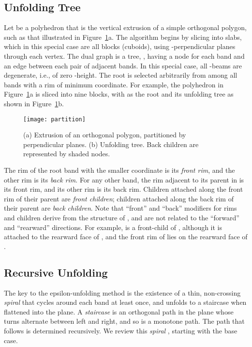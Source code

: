 \documentclass[11pt]{article}
\begin{document}
\subsection{Unfolding Tree}
\label{sec:Tree}
Let  be a polyhedron that is the vertical extrusion of a simple orthogonal polygon, such
as that illustrated in Figure~\ref{fig:partition}a.
The algorithm
begins by slicing  into slabs, which in this special case are all
blocks (cuboids),
using -perpendicular planes through each vertex.
The dual graph is a tree, , having a node for each band and an edge
between each pair of adjacent bands.
In this special case, all -beams are degenerate, i.e., of zero -height.
The root is selected arbitrarily from among
all bands with a rim of
minimum  coordinate. For example, the
polyhedron in Figure~\ref{fig:partition}a is sliced into nine
blocks, with  as the root and
its unfolding tree as shown in Figure~\ref{fig:partition}b.
\begin{figure}[htbp]
\centering
\texttt{[image: partition]}
\caption{(a) Extrusion of an orthogonal polygon, partitioned by  perpendicular planes. (b) Unfolding
  tree. Back children are represented by shaded nodes.}
\label{fig:partition}
\end{figure}


The rim of the root band with the
smaller  coordinate is its \emph{front rim}, and the other rim
is its \emph{back rim}. For any other band, the rim adjacent to its parent in  is
its front rim, and its other rim is its back rim.
Children attached along the front rim of their parent are \emph{front children}; children attached
along the back rim of their parent are \emph{back children}.
Note that ``front'' and ``back'' modifiers for rims and children derive from the structure of
, and are not related to the ``forward'' and ``rearward'' 
directions.
For example,  is a front-child of , although it is attached
to
the rearward face of , and the front rim of  lies
on the rearward face of .



\subsection{Recursive Unfolding}

The key to the epsilon-unfolding method is the existence of a thin, non-crossing \emph{spiral}  that cycles around each band
at least once, and unfolds to a staircase when flattened into the
plane.
A \emph{staircase} is an orthogonal path in the plane whose turns
alternate between  left and   right, and so is a
monotone path.
The path that  follows is determined recursively.
We review this \emph{spiral} , starting with the base case.
\end{document}
